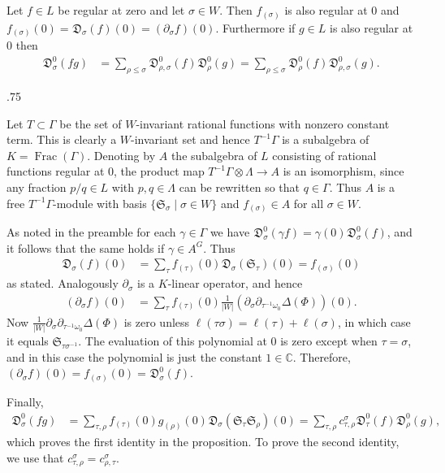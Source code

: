 \documentclass[11pt,fleqn]{amsart}
\makeatletter
\renewcommand\proofname{Proof}
\renewenvironment{proof}[1][\textit{\proofname}]{\par
 \pushQED{\qed}%
 \normalfont \topsep.75\paraskip\relax
 \trivlist
 \item[\hskip\labelsep
 \itshape
 #1\@addpunct{.}]\ignorespaces
}{%
 \popQED\endtrivlist\@endpefalse
}
\newcounter{para}[section]
\newcommand\CC{\mathbb C}
\newcommand\ot{\otimes}
\renewcommand\to{\longrightarrow}
\newcommand\D[3]{{}^{#1} \mathfrak D_{#2}^{#3}}
\renewcommand\SS{\mathfrak S}
\DeclareMathOperator\Frac{Frac}
\makeatother
\begin{document}
\begin{Proposition} \label{P:leibniz-rule}
Let $f \in L$ be regular at zero and let $\sigma \in W$. Then $f_{(\sigma)}$ 
is also regular at $0$ and $f_{(\sigma)}(0) = \D{}{\sigma}{}(f)(0) = 
(\partial_{\sigma} f)(0)$. Furthermore if $g \in L$ is also regular at $0$
then
\begin{align*}
\D{}{\sigma}{0}(fg)
	&= \sum_{\rho \leq \sigma} \D{}{\rho, \sigma}{0}(f) \D{}{\rho}{0}(g)
	= \sum_{\rho \leq \sigma} \D{}{\rho}{0}(f) \D{}{\rho, \sigma}{0}(g).
\end{align*}
\end{Proposition}
\begin{proof}
Let $T \subset \Gamma$ be the set of $W$-invariant rational functions with 
nonzero constant term. This is clearly a $W$-invariant set and hence 
$T^{-1} \Gamma$ is a subalgebra of $K = \Frac(\Gamma)$. Denoting by $A$ the 
subalgebra of $L$ consisting of rational functions regular at $0$, the product 
map $T^{-1} \Gamma \ot \Lambda \to A$ is an isomorphism, since any fraction 
$p/q \in L$ with $p,q \in \Lambda$ can be rewritten so that $q \in \Gamma$. 
Thus $A$ is a free $T^{-1}\Gamma$-module with basis $\{\SS_\sigma \mid \sigma 
\in W\}$ and $f_{(\sigma)} \in A$ for all $\sigma \in W$. 

As noted in the preamble for each $\gamma \in \Gamma$ we have 
$\D{}{\sigma}{0}(\gamma f) = \gamma(0) \D{}{\sigma}{0}(f)$, and it follows 
that the same holds if $\gamma \in A^G$. Thus
\begin{align*}
\D{}{\sigma}{}(f)(0)
	&= \sum_{\tau} f_{(\tau)}(0) \D{}{\sigma}{}(\SS_\tau)(0)
	= f_{(\sigma)}(0)
\end{align*}
as stated. Analogously $\partial_\sigma$ is a $K$-linear operator, and hence
\begin{align*}
(\partial_{\sigma} f)(0)
	&= \sum_{\tau} f_{(\tau)}(0) \frac{1}{|W|}(\partial_{\sigma} 
		\partial_{\tau^{-1}\omega_0} \Delta(\Phi))(0).
\end{align*}
Now $\frac{1}{|W|}\partial_{\sigma} \partial_{\tau^{-1}\omega_0} \Delta(\Phi)$ 
is zero unless $\ell(\tau \sigma) = \ell(\tau) + \ell(\sigma)$, in which case it 
equals $\SS_{\tau\sigma^{-1}}$. The evaluation of this polynomial at $0$ is zero 
except when $\tau = \sigma$, and in this case the polynomial is just the 
constant $1 \in \CC$. Therefore, $(\partial_{\sigma} f)(0) = f_{(\sigma)}(0) 
= \D{}{\sigma}{0}(f)$.

Finally,
\begin{align*}
\D{}{\sigma}{0}(fg)
	&= \sum_{\tau, \rho} f_{(\tau)}(0) g_{(\rho)}(0) 
		\D{}{\sigma}{}(\SS_\tau \SS_\rho)(0) 
	= \sum_{\tau, \rho} c_{\tau, \rho}^\sigma \D{}{\tau}{0}(f) 
	\D{}{\rho}{0}(g),
\end{align*}
which proves the first identity in the proposition. To prove the second identity, we use that
$c^\sigma_{\tau, \rho} = c^\sigma_{\rho, \tau}$.
\end{proof}
\end{document}
